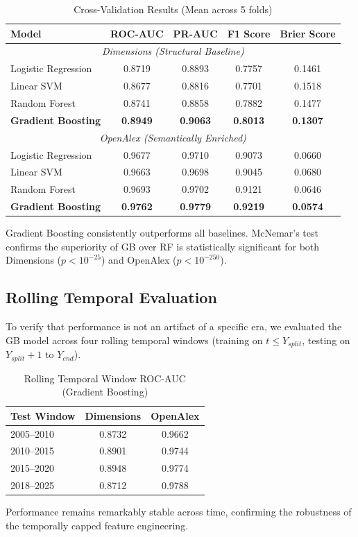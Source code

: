 \documentclass[11pt,a4paper]{article}
\begin{document}
\begin{table}[H]
\centering
\caption{Cross-Validation Results (Mean across 5 folds)}
\label{tab:cv}
\begin{tabular}{lcccc}
\toprule
\textbf{Model} & \textbf{ROC-AUC} & \textbf{PR-AUC} & \textbf{F1 Score} & \textbf{Brier Score} \\
\midrule
\multicolumn{5}{c}{\textit{Dimensions (Structural Baseline)}} \\
Logistic Regression & 0.8719 & 0.8893 & 0.7757 & 0.1461 \\
Linear SVM & 0.8677 & 0.8816 & 0.7701 & 0.1518 \\
Random Forest & 0.8741 & 0.8858 & 0.7882 & 0.1477 \\
\textbf{Gradient Boosting} & \textbf{0.8949} & \textbf{0.9063} & \textbf{0.8013} & \textbf{0.1307} \\
\midrule
\multicolumn{5}{c}{\textit{OpenAlex (Semantically Enriched)}} \\
Logistic Regression & 0.9677 & 0.9710 & 0.9073 & 0.0660 \\
Linear SVM & 0.9663 & 0.9698 & 0.9045 & 0.0680 \\
Random Forest & 0.9693 & 0.9702 & 0.9121 & 0.0646 \\
\textbf{Gradient Boosting} & \textbf{0.9762} & \textbf{0.9779} & \textbf{0.9219} & \textbf{0.0574} \\
\bottomrule
\end{tabular}
\end{table}

Gradient Boosting consistently outperforms all baselines. McNemar's test confirms the superiority of GB over RF is statistically significant for both Dimensions ($p < 10^{-25}$) and OpenAlex ($p < 10^{-250}$).

\subsection{Rolling Temporal Evaluation}
To verify that performance is not an artifact of a specific era, we evaluated the GB model across four rolling temporal windows (training on $t \le Y_{split}$, testing on $Y_{split}+1$ to $Y_{end}$).

\begin{table}[H]
\centering
\caption{Rolling Temporal Window ROC-AUC (Gradient Boosting)}
\label{tab:rolling}
\begin{tabular}{lcc}
\toprule
\textbf{Test Window} & \textbf{Dimensions} & \textbf{OpenAlex} \\
\midrule
2005--2010 & 0.8732 & 0.9662 \\
2010--2015 & 0.8901 & 0.9744 \\
2015--2020 & 0.8948 & 0.9774 \\
2018--2025 & 0.8712 & 0.9788 \\
\bottomrule
\end{tabular}
\end{table}
Performance remains remarkably stable across time, confirming the robustness of the temporally capped feature engineering.
\end{document}
